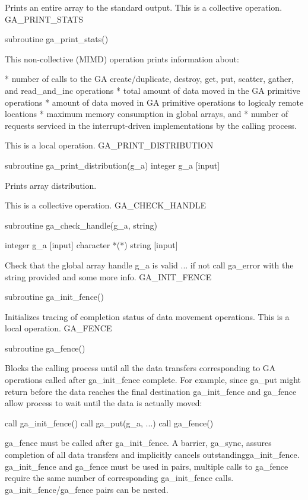 Prints an entire array to the standard output. This is a collective
operation. GA\_PRINT\_STATS

subroutine ga\_print\_stats()

This non-collective (MIMD) operation prints information about:

{*} number of calls to the GA create/duplicate, destroy, get, put,
scatter, gather, and read\_and\_inc operations {*} total amount of
data moved in the GA primitive operations {*} amount of data moved
in GA primitive operations to logicaly remote locations {*} maximum
memory consumption in global arrays, and {*} number of requests serviced
in the interrupt-driven implementations by the calling process.

This is a local operation. GA\_PRINT\_DISTRIBUTION

subroutine ga\_print\_distribution(g\_a) integer g\_a {[}input{]}

Prints array distribution.

This is a collective operation. GA\_CHECK\_HANDLE

subroutine ga\_check\_handle(g\_a, string)

integer g\_a {[}input{]} character {*}({*}) string {[}input{]}

Check that the global array handle g\_a is valid ... if not call ga\_error
with the string provided and some more info. GA\_INIT\_FENCE

subroutine ga\_init\_fence()

Initializes tracing of completion status of data movement operations.
This is a local operation. GA\_FENCE

subroutine ga\_fence()

Blocks the calling process until all the data transfers corresponding
to GA operations called after ga\_init\_fence complete. For example,
since ga\_put might return before the data reaches the final destination
ga\_init\_fence and ga\_fence allow process to wait until the data
is actually moved:

call ga\_init\_fence() call ga\_put(g\_a, ...) call ga\_fence()

ga\_fence must be called after ga\_init\_fence. A barrier, ga\_sync,
assures completion of all data transfers and implicitly cancels outstandingga\_init\_fence.
ga\_init\_fence and ga\_fence must be used in pairs, multiple calls
to ga\_fence require the same number of corresponding ga\_init\_fence
calls. ga\_init\_fence/ga\_fence pairs can be nested.

